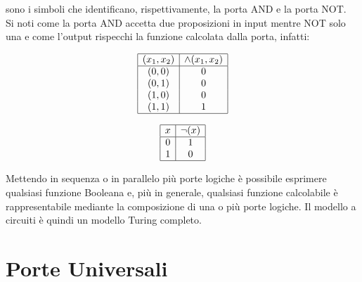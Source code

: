 \documentclass[12pt,a4paper,openright]{report}
\begin{document}
\noindent sono i simboli che identificano, rispettivamente, la porta AND e la porta NOT.\\
Si noti come la porta AND accetta due proposizioni in input mentre NOT solo una e come l'output rispecchi la funzione calcolata dalla porta, infatti:  \\

\vspace{\abovedisplayskip}
\begin{minipage}{.5\linewidth}
\begin{displaymath}
    \begin{array}{|c|c|}\hline
        (x_1, x_2) & \land{(x_1, x_2)} \\\hline 
        (0, 0)   &  0  \\ 
        (0, 1)   &  0  \\
        (1, 0)   &  0  \\
        (1, 1)   &  1  \\\hline
    \end{array}
    \end{displaymath}
\end{minipage}
\begin{minipage}{.5\linewidth}
\begin{displaymath}
    \begin{array}{|c|c|}\hline
        x & \neg{(x)} \\\hline 
        0   &  1  \\ 
        1   &  0  \\\hline
    \end{array}
\end{displaymath}
\end{minipage}

\vspace{\belowdisplayskip}
Mettendo in sequenza o in parallelo più porte logiche è possibile esprimere qualsiasi funzione Booleana e, più in generale, qualsiasi funzione calcolabile è rappresentabile mediante
la composizione di una o più porte logiche. Il modello a circuiti è quindi un modello Turing completo.\\
\section{Porte Universali}



 
\end{document}
